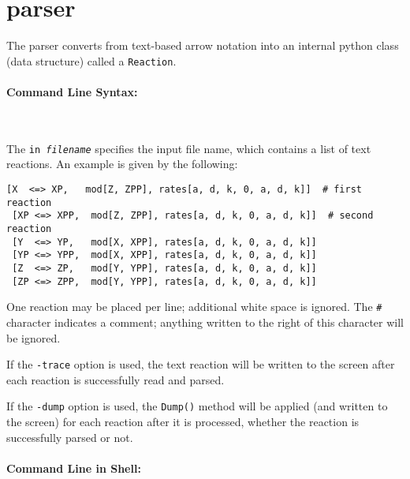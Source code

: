 \section{parser}

The parser converts from text-based arrow notation into an internal python class (data structure) called a {\tt Reaction}.



\paragraph{Command Line Syntax:}\ \\


The {\tt in \textit{filename}} specifies the input file name, which contains a list of text reactions. An example is given by the following:
\begin{Verbatim}[frame=single]
 [X  <=> XP,   mod[Z, ZPP], rates[a, d, k, 0, a, d, k]]  # first reaction
 [XP <=> XPP,  mod[Z, ZPP], rates[a, d, k, 0, a, d, k]]  # second reaction
 [Y  <=> YP,   mod[X, XPP], rates[a, d, k, 0, a, d, k]] 
 [YP <=> YPP,  mod[X, XPP], rates[a, d, k, 0, a, d, k]] 
 [Z  <=> ZP,   mod[Y, YPP], rates[a, d, k, 0, a, d, k]]
 [ZP <=> ZPP,  mod[Y, YPP], rates[a, d, k, 0, a, d, k]]
\end{Verbatim}
One reaction may be placed per line; additional white space is ignored. The {\tt \#} character indicates a comment; 
anything written to the right of this character will be ignored. 

If the {\tt -trace} option is used, the text reaction will be written to the screen after each reaction is successfully read and parsed.

If the {\tt -dump} option is used, the {\tt Dump()} method will be applied (and written to the screen) for each reaction after it is processed, whether the reaction is successfully parsed or not. 

\paragraph{Command Line in Shell:}\ \\

